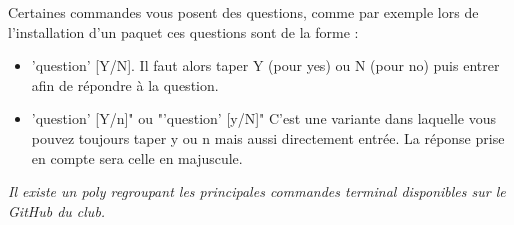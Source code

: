 Certaines commandes vous posent des questions, comme par exemple lors de
l'installation d'un paquet ces questions sont de la forme :

\begin{itemize}
\item 'question' [Y/N]. Il faut alors taper Y (pour yes) ou N (pour no) puis
entrer afin de répondre à la question.
\item 'question' [Y/n]" ou "'question' [y/N]" C'est une variante dans laquelle
vous pouvez toujours taper y ou n
mais aussi directement entrée. La réponse prise en compte sera celle en majuscule.
\end{itemize}

\textit{Il existe un poly regroupant les principales commandes terminal
disponibles sur le GitHub du club.}
